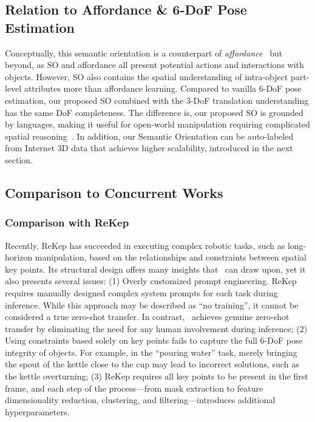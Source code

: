 \subsection{Relation to Affordance \& 6-DoF Pose Estimation}
Conceptually, this semantic orientation is a counterpart of \textit{affordance}~\citep{Affordance77,AffordanceHRI16,MoveWithAffordanceMaps20,HandsAsAffordancesProbes22} but beyond,
as SO and affordance all present potential actions and interactions with objects.
However, SO also contains the spatial understanding of intra-object part-level attributes more than affordance learning.
Compared to vanilla 6-DoF pose estimation, our proposed SO combined with the 3-DoF translation understanding has the same DoF completeness.
The difference is, our proposed SO is grounded by languages, making it useful for open-world manipulation requiring complicated spatial reasoning~\cite{RobotsThatUseLanguage20,SayCan22,Open6DOR24}. 
In addition, our Semantic Orientation can be auto-labeled from Internet 3D data that achieves higher scalability, introduced in the next section.



\subsection{Comparison to Concurrent Works}

\subsubsection{Comparison with ReKep~\cite{ReKep24}}
Recently, ReKep has succeeded in executing complex robotic tasks, such as long-horizon manipulation, based on the relationships and constraints between spatial key points. 
Its structural design offers many insights that \sofar~can draw upon, yet it also presents several issues: 
(1) Overly customized prompt engineering. ReKep requires manually designed complex system prompts for each task during inference. 
While this approach may be described as ``no training'', it cannot be considered a true zero-shot transfer. In contrast, \sofar~achieves genuine zero-shot transfer by eliminating the need for any human involvement during inference; (2) Using constraints based solely on key points fails to capture the full 6-DoF pose integrity of objects. For example, in the ``pouring water'' task, merely bringing the spout of the kettle close to the cup may lead to incorrect solutions, such as the kettle overturning; (3) ReKep requires all key points to be present in the first frame, and each step of the process—from mask extraction to feature dimensionality reduction, clustering, and filtering—introduces additional hyperparameters.

